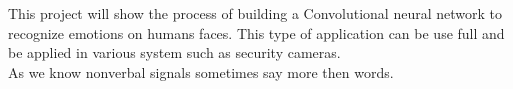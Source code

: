 This project will show the process of building a Convolutional
neural network to recognize emotions on humans faces.
This type of application can be use full and be applied
in various system such as security cameras. \\
As we know nonverbal signals sometimes say more then words.
